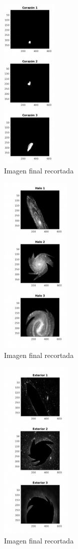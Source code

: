 \documentclass[10pt,journal,compsoc]{IEEEtran}\usepackage[T1]{fontenc}                              %
\begin{document}
\begin{figure}[!h]
	\caption{Imagen final recortada}
	\centering
	\includegraphics*[scale=0.4]{RP_6}
	\centering
	
\end{figure}


\begin{figure}[!h]
	\caption{Imagen final recortada}
	\centering
		\includegraphics*[scale=0.4]{RP_7}
	\centering
\end{figure}

\begin{figure}[!h]
	\caption{Imagen final recortada}
	\centering
	\includegraphics*[scale=0.4]{RP_8}
	\centering
\end{figure}
\end{document}
